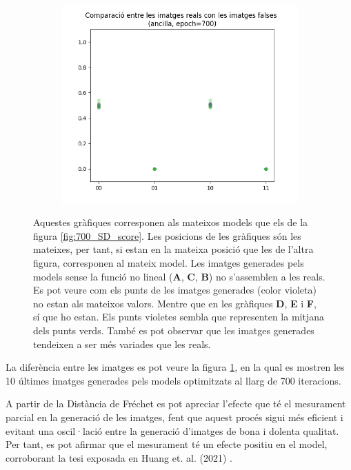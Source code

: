 \begin{figure}[H]
\begin{subfigure}[b]{.32\linewidth}
		\includegraphics[width=\linewidth]{figures/data/scatter_plot_A6.png}
		\caption{}
	\end{subfigure}
	\caption{Aquestes gràfiques corresponen als mateixos models que els de la figura \ref{fig:700_SD_score}. Les posicions de les gràfiques són les mateixes, per tant, si estan en la mateixa posició que les de l'altra figura, corresponen al mateix model. Les imatges generades pels models sense la funció no lineal (\textbf{A}, \textbf{C}, \textbf{B}) no s'assemblen a les reals. Es pot veure com els punts de les imatges generades (color violeta) no estan als mateixos valors. Mentre que en les gràfiques \textbf{D}, \textbf{E} i \textbf{F}, sí que ho estan. Els punts violetes sembla que representen la mitjana dels punts verds. També es pot observar que les imatges generades tendeixen a ser més variades que les reals.}
	\label{fig:700_images}
\end{figure}

La diferència entre les imatges es pot veure la figura \ref{fig:700_images}, en la qual es mostren les 10 últimes imatges generades pels models optimitzats al llarg de 700 iteracions.

A partir de la Distància de Fréchet es pot apreciar l'efecte que té el mesurament parcial en la generació de les imatges, fent que aquest procés sigui més eficient i evitant una oscil·lació entre la generació d'imatges de bona i dolenta qualitat. Per tant, es pot afirmar que el mesurament té un efecte positiu en el model, corroborant la tesi exposada en Huang et. al. (2021) \cite{QGAN_exp}. 

